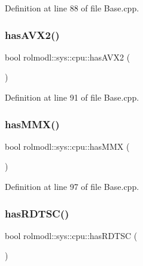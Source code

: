 Definition at line 88 of file Base.\+cpp.

\mbox{\label{namespacerolmodl_1_1sys_1_1cpu_a1eabddb9c18dd8feff43773589cf4fcb}} 
\subsubsection{\texorpdfstring{hasAVX2()}{hasAVX2()}}
{\footnotesize\ttfamily bool rolmodl\+::sys\+::cpu\+::has\+A\+V\+X2 (\begin{DoxyParamCaption}{ }\end{DoxyParamCaption})\hspace{0.3cm}{\ttfamily [noexcept]}}



Definition at line 91 of file Base.\+cpp.

\mbox{\label{namespacerolmodl_1_1sys_1_1cpu_a3dab852b21f17995c8e1c3f9b5a56dfa}} 
\subsubsection{\texorpdfstring{hasMMX()}{hasMMX()}}
{\footnotesize\ttfamily bool rolmodl\+::sys\+::cpu\+::has\+M\+MX (\begin{DoxyParamCaption}{ }\end{DoxyParamCaption})\hspace{0.3cm}{\ttfamily [noexcept]}}



Definition at line 97 of file Base.\+cpp.

\mbox{\label{namespacerolmodl_1_1sys_1_1cpu_a87cea05fb8dec9396eee8147e1cd239b}} 
\subsubsection{\texorpdfstring{hasRDTSC()}{hasRDTSC()}}
{\footnotesize\ttfamily bool rolmodl\+::sys\+::cpu\+::has\+R\+D\+T\+SC (\begin{DoxyParamCaption}{ }\end{DoxyParamCaption})\hspace{0.3cm}{\ttfamily [noexcept]}}



